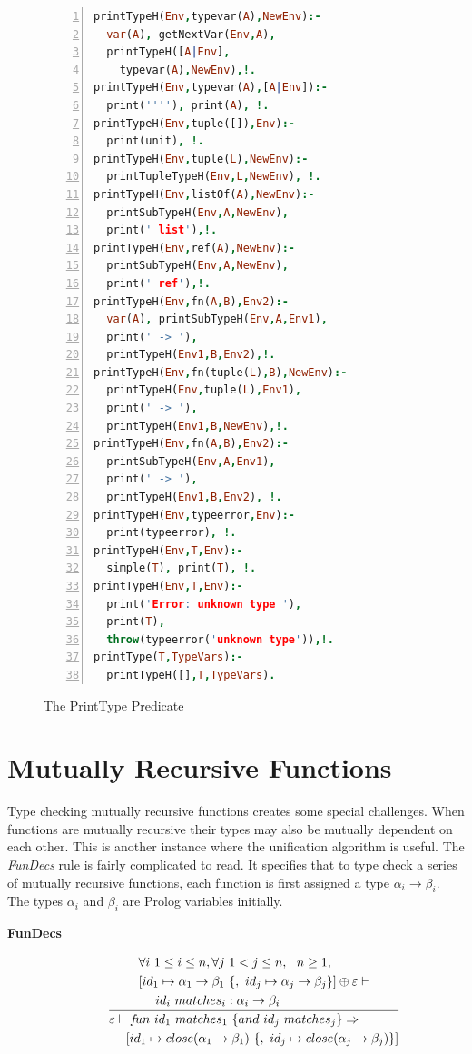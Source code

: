 \documentclass[10pt]{luthercs}
\begin{document}
\begin{figure}[htbp]
\begin{lstlisting}[language=Prolog,numbers=left,numberstyle=\tiny]
printTypeH(Env,typevar(A),NewEnv):- 
  var(A), getNextVar(Env,A), 
  printTypeH([A|Env],
    typevar(A),NewEnv),!.
printTypeH(Env,typevar(A),[A|Env]):- 
  print(''''), print(A), !.
printTypeH(Env,tuple([]),Env):- 
  print(unit), !.
printTypeH(Env,tuple(L),NewEnv):-
  printTupleTypeH(Env,L,NewEnv), !. 
printTypeH(Env,listOf(A),NewEnv):-
  printSubTypeH(Env,A,NewEnv), 
  print(' list'),!.
printTypeH(Env,ref(A),NewEnv):- 
  printSubTypeH(Env,A,NewEnv), 
  print(' ref'),!.
printTypeH(Env,fn(A,B),Env2):- 
  var(A), printSubTypeH(Env,A,Env1), 
  print(' -> '), 
  printTypeH(Env1,B,Env2),!.
printTypeH(Env,fn(tuple(L),B),NewEnv):- 
  printTypeH(Env,tuple(L),Env1), 
  print(' -> '), 
  printTypeH(Env1,B,NewEnv),!.
printTypeH(Env,fn(A,B),Env2):- 
  printSubTypeH(Env,A,Env1), 
  print(' -> '), 
  printTypeH(Env1,B,Env2), !.
printTypeH(Env,typeerror,Env):- 
  print(typeerror), !.
printTypeH(Env,T,Env):- 
  simple(T), print(T), !. 
printTypeH(Env,T,Env):- 
  print('Error: unknown type '), 
  print(T), 
  throw(typeerror('unknown type')),!.
printType(T,TypeVars):- 
  printTypeH([],T,TypeVars).
\end{lstlisting}
\caption{The PrintType Predicate}
\label{printtype}
\end{figure}

\section{Mutually Recursive Functions}

Type checking mutually recursive functions creates some special challenges. When functions are mutually recursive their types may also be mutually dependent on each other. This is another instance where the unification algorithm is useful. The {\em FunDecs} rule is fairly complicated to read. It specifies that to type check a series of mutually recursive functions, each function is first assigned a type $\alpha_i \rightarrow \beta_i$. The types $\alpha_i$ and $\beta_i$ are Prolog variables initially. 

\begin{description}
\item[{\textbf{FunDecs}}] \begin{gather}
\frac{\begin{split}&  \forall i~1 \leq i \leq n, \forall j~1 < j \leq n,~~n \geq 1,\\
& [id_1\mapsto\alpha_1\rightarrow\beta_1~\{,~id_j\mapsto\alpha_j\rightarrow\beta_j\}]\oplus\varepsilon\vdash \\ & ~~~~id_i~matches_i:\alpha_i\rightarrow\beta_i\end{split}}{\begin{split} & \varepsilon\vdash f\!un~id_1~matches_1~\{and~id_j~matches_j\}\Rightarrow \\ & ~~~~[id_1\mapsto close(\alpha_1\rightarrow\beta_1)~\{,~id_j\mapsto close(\alpha_j\rightarrow\beta_j)\}]\end{split}}\notag
\end{gather}
\end{description}
\end{document}
